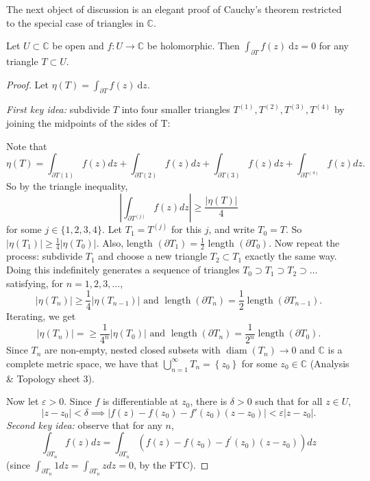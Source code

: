 \documentclass[egregdoesnotlikesansseriftitles,a4paper]{scrartcl}
\begin{document}
The next object of discussion is an elegant proof of Cauchy's theorem restricted to the special case of triangles in $\mathbb{C}$.
\begin{theorem}\label{cauchytriangle}
      Let $U \subset \mathbb{C}$ be open and $f: U \rightarrow \mathbb{C}$ be holomorphic. Then $\int_{\partial T}^{}f (z) \ \mathrm{d}z=0 $ for any triangle $T \subset U$.
\end{theorem}
\begin{proof}
      Let $\eta (T)=\int_{\partial T}^{}f (z) \ \mathrm{d}z$.
      
      \emph{First key idea:} subdivide $T$ into four smaller triangles $T^{(1)},T^{(2)},T^{(3)},T^{(4)}$ by joining the midpoints of the sides of T:
      
      
      Note that \[
          \eta(T)=\int_{\partial T(1)} f(z) d z+\int_{\partial T(2)} f(z) d z+\int_{\partial T(3)} f(z) d z+\int_{\partial T^{(4)}} f(z) d z
      .\] 
     So by the triangle inequality,
     $$
     \left|\int_{\partial T^{(j)}} f(z) d z\right| \geq \frac{|\eta(T)|}{4}
     $$
     for some $j \in\{1,2,3,4\}$. Let $T_{1}=T^{(j)}$ for this $j$, and write $T_{0}=T$. So $\left|\eta\left(T_{1}\right)\right| \geq \frac{1}{4}\left|\eta\left(T_{0}\right)\right|$. Also, length $\left(\partial T_{1}\right)=\frac{1}{2}$ length $\left(\partial T_{0}\right)$.
     Now repeat the process: subdivide $T_{1}$ and choose a new triangle $T_{2} \subset T_{1}$ exactly the same way. Doing this indefinitely generates a sequence of triangles $T_{0} \supset T_{1} \supset T_{2} \supset \ldots$ satisfying, for $n=1,2,3, \ldots$, \[
     |\eta (T_{n})| \geq \frac{1}{4}|\eta (T_{n-1})| \text{ and } \operatorname{length}(\partial T_{n})=\frac{1}{2}\operatorname{length}(\partial T_{n-1})
     .\] Iterating, we get \[
          |\eta (T_{n})|=\geq \frac{1}{4^{n}}|\eta (T_{0})| \text{ and } \operatorname{length}(\partial T_{n})=\frac{1}{2^{n}}\operatorname{length}(\partial T_{0})
     .\] Since $T_{n}$ are non-empty, nested closed subsets with $\operatorname{diam}(T_{n})\rightarrow 0$ and $\mathbb{C}$ is a complete metric space, we have that $\bigcup_{n=1}^{ \infty}T_{n}=\left\{z_0 \right\}$ for some $z_0 \in \mathbb{C}$ (Analysis \& Topology sheet 3).

     Now let $\varepsilon >0$. Since $f$ is differentiable at $z_0 $, there is $\delta >0$ such that for all $z \in U$, \[
     |z-z_0 |<\delta \implies |f (z)-f (z_0 )-f' (z_0 )(z-z_0 )| < \varepsilon |z-z_0 |
     .\] \emph{Second key idea:} observe that for any $n$, \[
          \int_{\partial T_{n}} f(z) d z=\int_{\partial T_{n}}\left(f(z)-f\left(z_{0}\right)-f^{\prime}\left(z_{0}\right)\left(z-z_{0}\right)\right) d z
     \] (since $\int_{\partial T_{n}} 1 d z=\int_{\partial T_{n}} z d z=0$, by the FTC). 
     

\end{proof}
\end{document}
